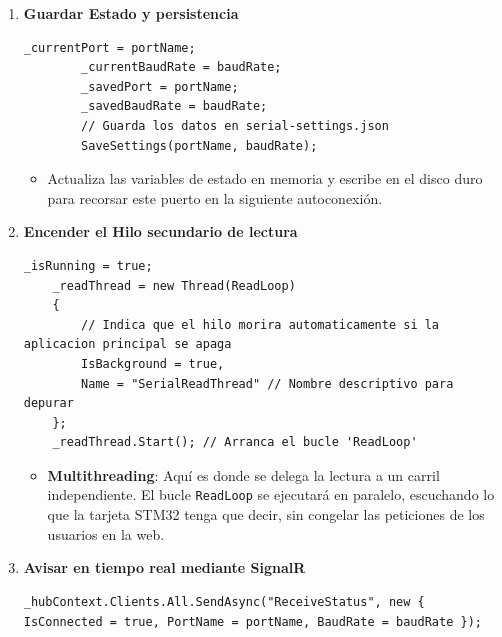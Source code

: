 \documentclass[
10pt, %
a4paper, %
oneside, %
headinclude,footinclude, %
BCOR5mm, %
]{scrartcl}
\begin{document}
\begin{enumerate}
\begin{lstlisting}[style=VSCodeDark]
	// Limpiar buffers para evitar ruido de conexion inicial
	_serialPort.DiscardInBuffer();
	_serialPort.DiscardOutBuffer();
	\end{lstlisting}
	\begin{itemize}
		\item Crea el objeto \texttt{SerialPort} con los parámetros del usuario y define los tiempos límite de espera (timeouts).
		\item \texttt{DiscardInBuffer()} y \texttt{DiscardOutBuffer()}: Limpia toda la "basura" o ruido eléctrico que pueda haber quedado en el cable USB en conexiones anteriores para iniciar con un canal limpio de datos.
	\end{itemize}
	\item \textbf{Guardar Estado y persistencia}
		\begin{lstlisting}[style=VSCodeDark]
		_currentPort = portName;
		_currentBaudRate = baudRate;
		_savedPort = portName;
		_savedBaudRate = baudRate;
		// Guarda los datos en serial-settings.json
		SaveSettings(portName, baudRate); \end{lstlisting}
		\begin{itemize}
			\item Actualiza las variables de estado en memoria y escribe en el disco duro para recorsar este puerto en la siguiente autoconexión.
		\end{itemize}
	\item \textbf{Encender el Hilo secundario de lectura}
	\begin{lstlisting}[style=VSCodeDark]
	_isRunning = true;
	_readThread = new Thread(ReadLoop)
	{
		// Indica que el hilo morira automaticamente si la aplicacion principal se apaga
		IsBackground = true,     
		Name = "SerialReadThread" // Nombre descriptivo para depurar
	};
	_readThread.Start(); // Arranca el bucle 'ReadLoop'\end{lstlisting}
	\begin{itemize}
		\item \textbf{Multithreading}: Aquí es donde se delega la lectura a un carril independiente. El bucle \texttt{ReadLoop} se ejecutará en paralelo, escuchando lo que la tarjeta STM32 tenga que decir, sin congelar las peticiones de los usuarios en la web.
	\end{itemize}
	\item \textbf{Avisar en tiempo real mediante SignalR}
		\begin{lstlisting}[style=VSCodeDark]
		_hubContext.Clients.All.SendAsync("ReceiveStatus", new { IsConnected = true, PortName = portName, BaudRate = baudRate });

\end{lstlisting}
\end{enumerate}
\end{document}
